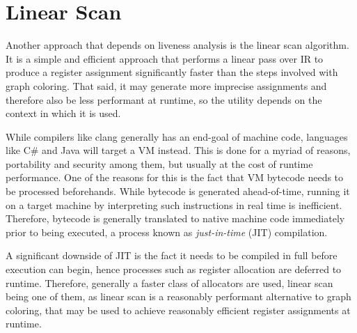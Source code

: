 \documentclass{article}
\begin{document}
\section{Linear Scan}
Another approach that depends on liveness analysis is the linear scan algorithm.
It is a simple and efficient approach that performs a linear pass over IR to produce a register assignment significantly faster than the steps involved with graph coloring.
That said, it may generate more imprecise assignments and therefore also be less performant at runtime, so the utility depends on the context in which it is used.

While compilers like clang generally has an end-goal of machine code, languages like C\# and Java 
will target a VM instead.
This is done for a myriad of reasons, portability and security among them, but usually at the cost of runtime performance. One of the reasons for this is the fact that VM bytecode needs to be processed beforehands.
While bytecode is generated ahead-of-time, running it on a target machine by interpreting such instructions in real time is inefficient.
Therefore, bytecode is generally translated to native machine code immediately prior to being executed, a process known as \textit{just-in-time} (JIT) compilation.

A significant downside of JIT is the fact it needs to be compiled in full before execution can begin, hence processes such as register allocation are deferred to runtime.
Therefore, generally a faster class of allocators are used, linear scan being one of them, as linear scan is a reasonably performant alternative to graph coloring, that may be used to achieve reasonably efficient register assignments at runtime.
\end{document}
